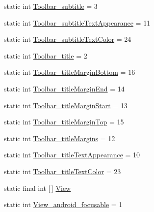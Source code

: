 \begin{DoxyCompactItemize}
\item 
static int \hyperlink{classandroid_1_1support_1_1v7_1_1appcompat_1_1R_1_1styleable_a2cbf4193bb5275277f1f000819d09790}{Toolbar\+\_\+subtitle} = 3
\item 
static int \hyperlink{classandroid_1_1support_1_1v7_1_1appcompat_1_1R_1_1styleable_ad4f03da4f62ec7ae8eb42d3aafb404ef}{Toolbar\+\_\+subtitle\+Text\+Appearance} = 11
\item 
static int \hyperlink{classandroid_1_1support_1_1v7_1_1appcompat_1_1R_1_1styleable_a0d191ed721e0d27dabbefa262648c353}{Toolbar\+\_\+subtitle\+Text\+Color} = 24
\item 
static int \hyperlink{classandroid_1_1support_1_1v7_1_1appcompat_1_1R_1_1styleable_ae82c877334b3ecc680d267e91832e912}{Toolbar\+\_\+title} = 2
\item 
static int \hyperlink{classandroid_1_1support_1_1v7_1_1appcompat_1_1R_1_1styleable_a9412dd4f8671bfd3fbc475b6bb4b9686}{Toolbar\+\_\+title\+Margin\+Bottom} = 16
\item 
static int \hyperlink{classandroid_1_1support_1_1v7_1_1appcompat_1_1R_1_1styleable_a141a5fe7ad67958248bcacd6a5f7043d}{Toolbar\+\_\+title\+Margin\+End} = 14
\item 
static int \hyperlink{classandroid_1_1support_1_1v7_1_1appcompat_1_1R_1_1styleable_aa1690beeeb06a36f3c4d56b00ea8777d}{Toolbar\+\_\+title\+Margin\+Start} = 13
\item 
static int \hyperlink{classandroid_1_1support_1_1v7_1_1appcompat_1_1R_1_1styleable_a321e1d73a518a11499a1757e88716f30}{Toolbar\+\_\+title\+Margin\+Top} = 15
\item 
static int \hyperlink{classandroid_1_1support_1_1v7_1_1appcompat_1_1R_1_1styleable_aeae44f37b9e7934071b303e4412587c2}{Toolbar\+\_\+title\+Margins} = 12
\item 
static int \hyperlink{classandroid_1_1support_1_1v7_1_1appcompat_1_1R_1_1styleable_a95960040ba30a96fcd381c8f67ec461d}{Toolbar\+\_\+title\+Text\+Appearance} = 10
\item 
static int \hyperlink{classandroid_1_1support_1_1v7_1_1appcompat_1_1R_1_1styleable_a5597aef1e76e3ced24dcc4d749c2af73}{Toolbar\+\_\+title\+Text\+Color} = 23
\item 
static final int \mbox{[}$\,$\mbox{]} \hyperlink{classandroid_1_1support_1_1v7_1_1appcompat_1_1R_1_1styleable_a0105bc03f2606ae1fc5f05a515d81b3c}{View}
\item 
static int \hyperlink{classandroid_1_1support_1_1v7_1_1appcompat_1_1R_1_1styleable_a0d7d9839026cd18de7e33d7095851319}{View\+\_\+android\+\_\+focusable} = 1

\end{DoxyCompactItemize}
